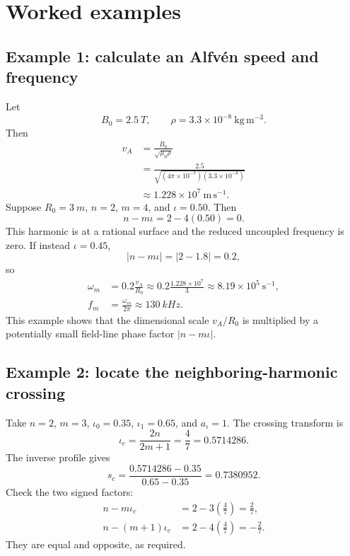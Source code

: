 \section{Worked examples}
\label{sec:worked_examples}

\subsection{Example 1: calculate an Alfv\'en speed and frequency}
Let
\begin{equation}
B_0=\SI{2.5}{T},
\qquad
\rho=3.3\times10^{-8}\ \mathrm{kg\,m^{-3}}.
\end{equation}
Then
\begin{align}
v_A
&=\frac{B_0}{\sqrt{\mu_0\rho}}\\
&=\frac{2.5}{\sqrt{(4\pi\times10^{-7})(3.3\times10^{-8})}}\\
&\approx1.228\times10^7\ \mathrm{m\,s^{-1}}.
\end{align}
Suppose $R_0=\SI{3}{m}$, $n=2$, $m=4$, and $\iota=0.50$. Then
\begin{equation}
n-m\iota=2-4(0.50)=0.
\end{equation}
This harmonic is at a rational surface and the reduced uncoupled frequency is zero. If instead $\iota=0.45$,
\begin{equation}
|n-m\iota|=|2-1.8|=0.2,
\end{equation}
so
\begin{align}
\omega_m&=0.2\frac{v_A}{R_0}
\approx0.2\frac{1.228\times10^7}{3}
\approx8.19\times10^5\ \mathrm{s^{-1}},\\
f_m&=\frac{\omega_m}{2\pi}\approx\SI{130}{kHz}.
\end{align}
This example shows that the dimensional scale $v_A/R_0$ is multiplied by a potentially small field-line phase factor $|n-m\iota|$.

\subsection{Example 2: locate the neighboring-harmonic crossing}
Take $n=2$, $m=3$, $\iota_0=0.35$, $\iota_1=0.65$, and $a_\iota=1$. The crossing transform is
\begin{equation}
\iota_c=\frac{2n}{2m+1}=\frac{4}{7}=0.5714286.
\end{equation}
The inverse profile gives
\begin{equation}
s_c=\frac{0.5714286-0.35}{0.65-0.35}=0.7380952.
\end{equation}
Check the two signed factors:
\begin{align}
n-m\iota_c&=2-3\left(\frac{4}{7}\right)=\frac{2}{7},\\
n-(m+1)\iota_c&=2-4\left(\frac{4}{7}\right)=-\frac{2}{7}.
\end{align}
They are equal and opposite, as required.


